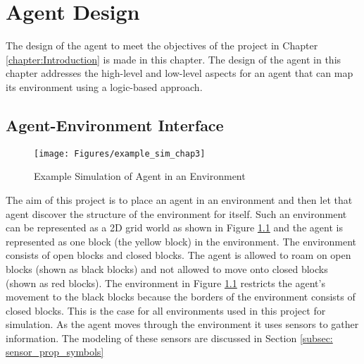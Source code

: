 \chapter{Agent Design} 
\label{chapter:Agent_Design}

The design of the agent to meet the objectives of the project in Chapter \ref{chapter:Introduction} is made in this chapter. The design of the agent in this chapter addresses the high-level and low-level aspects for an agent that can map its environment using a logic-based approach.



\section{Agent-Environment Interface}

\begin{figure}[H]
    \centering
    \texttt{[image: Figures/example\_sim\_chap3]}
    \caption{Example Simulation of Agent in an Environment} 
    \label{fig:agent_in_env_low_level}
\end{figure}

The aim of this project is to place an agent in an environment and then let that agent discover the structure of the environment for itself. Such an environment can be represented as a 2D grid world as shown in Figure \ref{fig:agent_in_env_low_level} and the agent is represented as one block (the yellow block) in the environment. The environment consists of open blocks and closed blocks. The agent is allowed to roam on open blocks (shown as black blocks) and not allowed to move onto closed blocks (shown as red blocks). The environment in Figure \ref{fig:agent_in_env_low_level} restricts the agent's movement to the black blocks because the borders of the environment consists of closed blocks. This is the case for all environments used in this project for simulation. As the agent moves through the environment it uses sensors to gather information. The modeling of these sensors are discussed in Section \ref{subsec: sensor_prop_symbols}


